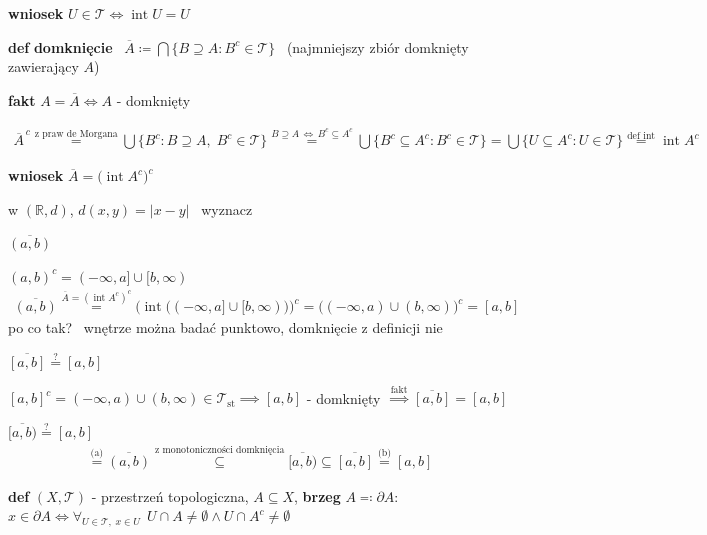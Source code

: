 \documentclass[a4paper,12pt]{article}
\begin{document}
\smallskip
\textbf{wniosek} \; \(U \in \mathcal{T} \iff \operatorname{int} U = U\)

\bigskip
\textbf{def} \; \textbf{domknięcie} \, \(\overline{A} \coloneqq \bigcap \{B \supseteq A : B^c \in \mathcal{T}\}\) \, (najmniejszy zbiór domknięty zawierający \(A\))

\smallskip
\textbf{fakt} \; \(A = \overline{A} \iff A\) - domknięty

\bigskip
\begin{align*}
\overline{A}^{\,c} \overset{\text{z praw de Morgana}}{=} \bigcup \{B^c : B \supseteq A, \; B^c \in \mathcal{T}\} \overset{B \supseteq A \, \iff \, B^c \subseteq A^c}{=} \bigcup \{B^c \subseteq A^c : B^c \in \mathcal{T}\} = \bigcup \{U \subseteq A^c : U \in \mathcal{T}\} \overset{\text{def int}}{=} \operatorname{int} A^c
\end{align*}

\smallskip
\textbf{wniosek} \; \(\overline{A} = \big(\operatorname{int} A^c\big)^c\)

\bigskip
{} \; w \((\mathbb{R}, d)\), \; \(d(x, y) = |x - y|\) \, wyznacz
\begin{podpunkty}
    \item \(\overline{(a, b)}\)

    \smallskip
    \((a, b)^c = (-\infty, a] \cup [b, \infty)\)
    \begin{align*}
    \overline{(a, b)} \overset{\overline{A} = (\operatorname{int} A^c)^c}{=} \big(\operatorname{int}\big((-\infty, a] \cup [b, \infty)\big)\big)^c = \big((-\infty, a) \cup (b, \infty)\big)^c = [a, b]
    \end{align*}
    po co tak? \, wnętrze można badać punktowo, domknięcie z definicji nie
    \item \(\overline{[a, b]} \overset{?}{=} [a, b]\)

    \smallskip
    \([a, b]^c = (-\infty, a) \cup (b, \infty) \in \mathcal{T}_{\text{st}} \implies [a, b]\) - domknięty \(\overset{\text{fakt}}{\implies} \overline{[a, b]} = [a, b]\)
    \item \(\overline{[a, b)} \overset{?}{=} [a, b]\)
    \begin{align*}
    [a, b] \overset{\text{(a)}}{=} \overline{(a, b)} \overset{\text{z monotoniczności domknięcia}}{\subseteq} \overline{[a, b)} \subseteq \overline{[a, b]} \overset{\text{(b)}}{=} [a, b]
    \end{align*}
\end{podpunkty}

\bigskip
\textbf{def} \; \((X, \mathcal{T})\) - przestrzeń topologiczna, \; \(A \subseteq X\), \; \textbf{brzeg} \(A \eqqcolon \partial A\): \, \(x \in \partial A \iff \forall_{U \in \mathcal{T}, \; x \in U} \;\, U \cap A \neq \emptyset \land U \cap A^c \neq \emptyset\)
\end{document}
